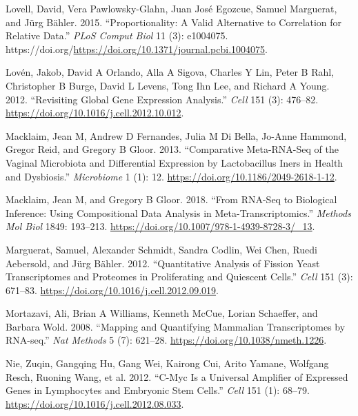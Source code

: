 \documentclass[
]{article}
\newlength{\cslhangindent}
\newlength{\cslentryspacingunit} %
\newenvironment{CSLReferences}[2] %
 {%
  \setlength{\parindent}{0pt}
  \ifodd #1
  \let\oldpar\par
  \def\par{\hangindent=\cslhangindent\oldpar}
  \fi
  \setlength{\parskip}{#2\cslentryspacingunit}
 }%
 {}
\begin{document}
\begin{CSLReferences}{1}{0}
\leavevmode{}%
Lovell, David, Vera Pawlowsky-Glahn, Juan José Egozcue, Samuel
Marguerat, and Jürg Bähler. 2015. {``Proportionality: A Valid
Alternative to Correlation for Relative Data.''} \emph{PLoS Comput Biol}
11 (3): e1004075.
https://doi.org/\url{https://doi.org/10.1371/journal.pcbi.1004075}.

\leavevmode{}%
Lovén, Jakob, David A Orlando, Alla A Sigova, Charles Y Lin, Peter B
Rahl, Christopher B Burge, David L Levens, Tong Ihn Lee, and Richard A
Young. 2012. {``Revisiting Global Gene Expression Analysis.''}
\emph{Cell} 151 (3): 476--82.
\url{https://doi.org/10.1016/j.cell.2012.10.012}.

\leavevmode{}%
Macklaim, Jean M, Andrew D Fernandes, Julia M Di Bella, Jo-Anne Hammond,
Gregor Reid, and Gregory B Gloor. 2013. {``Comparative Meta-{RNA}-Seq of
the Vaginal Microbiota and Differential Expression by Lactobacillus
Iners in Health and Dysbiosis.''} \emph{Microbiome} 1 (1): 12.
\url{https://doi.org/10.1186/2049-2618-1-12}.

\leavevmode{}%
Macklaim, Jean M, and Gregory B Gloor. 2018. {``From {RNA}-Seq to
Biological Inference: Using Compositional Data Analysis in
Meta-Transcriptomics.''} \emph{Methods Mol Biol} 1849: 193--213.
\url{https://doi.org/10.1007/978-1-4939-8728-3/_13}.

\leavevmode{}%
Marguerat, Samuel, Alexander Schmidt, Sandra Codlin, Wei Chen, Ruedi
Aebersold, and Jürg Bähler. 2012. {``Quantitative Analysis of Fission
Yeast Transcriptomes and Proteomes in Proliferating and Quiescent
Cells.''} \emph{Cell} 151 (3): 671--83.
\url{https://doi.org/10.1016/j.cell.2012.09.019}.

\leavevmode{}%
Mortazavi, Ali, Brian A Williams, Kenneth McCue, Lorian Schaeffer, and
Barbara Wold. 2008. {``Mapping and Quantifying Mammalian Transcriptomes
by {RNA-seq}.''} \emph{Nat Methods} 5 (7): 621--28.
\url{https://doi.org/10.1038/nmeth.1226}.

\leavevmode{}%
Nie, Zuqin, Gangqing Hu, Gang Wei, Kairong Cui, Arito Yamane, Wolfgang
Resch, Ruoning Wang, et al. 2012. {``C-{M}yc Is a Universal Amplifier of
Expressed Genes in Lymphocytes and Embryonic Stem Cells.''} \emph{Cell}
151 (1): 68--79. \url{https://doi.org/10.1016/j.cell.2012.08.033}.


\end{CSLReferences}
\end{document}
